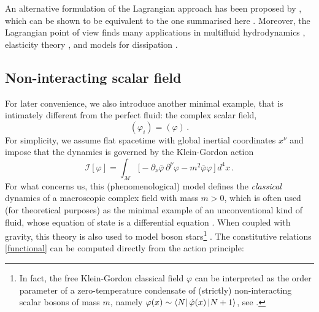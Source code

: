 \documentclass[a4paper, amsfonts, amssymb, amsmath, reprint, twocolumn, showkeys, nofootinbib]{revtex4-2}
\begin{document}
An alternative formulation of the Lagrangian approach  has been proposed by \citet{Dubosky2012_effective}, which can be shown to be equivalent to the one summarised here \citep{Termo}. Moreover, the Lagrangian point of view finds many applications in multifluid hydrodynamics \citep{Carter_starting_point,andersson2007review}, elasticity theory \citep{CarterQuintana1972,ander_elasticity_2019}, and models for dissipation \citep{Grozdanov2013,AnderssonComerDissAct2015,TorrieriIS2016,CeloraNils2020}.

\subsection{Non-interacting scalar field} 

For later convenience, we also introduce another minimal example, that is intimately different from the perfect fluid: the complex scalar field, 
\begin{equation}
(\varphi_i) = (\varphi) \, .
\label{qwertyqwerty}
\end{equation}
For simplicity, we assume flat spacetime with global inertial coordinates $x^\nu$ and impose that the dynamics is governed by the Klein-Gordon action \citep{weinbergQFT_1995}
\begin{equation}\label{action}
\mathcal{I}[\varphi] = \int_{\mathcal{M}} \big[ -\partial_\nu \bar{\varphi} \, \partial^\nu \varphi - m^2 \bar{\varphi} \varphi  \, \big]  \, d^4 x \, .
\end{equation}    
For what concerns us, this (phenomenological) model defines the \textit{classical}  dynamics of a macroscopic complex field with mass $m>0$, which is often used (for theoretical purposes) as the minimal example of an unconventional kind of fluid, whose equation of state is a differential equation \citep{KGgeon}. 
When coupled with gravity, this theory is also used to model  boson stars\footnote{
    In fact, the free Klein-Gordon classical field $\varphi$ can be interpreted as the order parameter of a zero-temperature condensate of (strictly) non-interacting scalar bosons of mass $m$, namely 
    $\varphi(x) \sim \bra{N} \hat{\varphi}(x) \ket{N+1}$, see \citep{landau9,CosmoCondesnato1993,Chavanis2012}. }
\citep{Liebling2012}.
The constitutive relations \eqref{functional} can be computed directly from the action principle:
\end{document}
